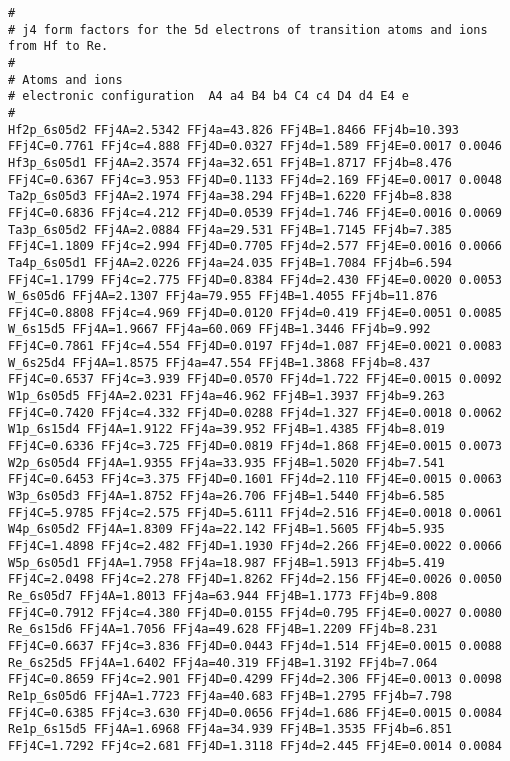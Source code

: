 {\begin{verbatim}
#
# j4 form factors for the 5d electrons of transition atoms and ions from Hf to Re.
#
# Atoms and ions
# electronic configuration  A4 a4 B4 b4 C4 c4 D4 d4 E4 e
#
Hf2p_6s05d2 FFj4A=2.5342 FFj4a=43.826 FFj4B=1.8466 FFj4b=10.393 FFj4C=0.7761 FFj4c=4.888 FFj4D=0.0327 FFj4d=1.589 FFj4E=0.0017 0.0046 
Hf3p_6s05d1 FFj4A=2.3574 FFj4a=32.651 FFj4B=1.8717 FFj4b=8.476 FFj4C=0.6367 FFj4c=3.953 FFj4D=0.1133 FFj4d=2.169 FFj4E=0.0017 0.0048 
Ta2p_6s05d3 FFj4A=2.1974 FFj4a=38.294 FFj4B=1.6220 FFj4b=8.838 FFj4C=0.6836 FFj4c=4.212 FFj4D=0.0539 FFj4d=1.746 FFj4E=0.0016 0.0069 
Ta3p_6s05d2 FFj4A=2.0884 FFj4a=29.531 FFj4B=1.7145 FFj4b=7.385 FFj4C=1.1809 FFj4c=2.994 FFj4D=0.7705 FFj4d=2.577 FFj4E=0.0016 0.0066 
Ta4p_6s05d1 FFj4A=2.0226 FFj4a=24.035 FFj4B=1.7084 FFj4b=6.594 FFj4C=1.1799 FFj4c=2.775 FFj4D=0.8384 FFj4d=2.430 FFj4E=0.0020 0.0053 
W_6s05d6 FFj4A=2.1307 FFj4a=79.955 FFj4B=1.4055 FFj4b=11.876 FFj4C=0.8808 FFj4c=4.969 FFj4D=0.0120 FFj4d=0.419 FFj4E=0.0051 0.0085 
W_6s15d5 FFj4A=1.9667 FFj4a=60.069 FFj4B=1.3446 FFj4b=9.992 FFj4C=0.7861 FFj4c=4.554 FFj4D=0.0197 FFj4d=1.087 FFj4E=0.0021 0.0083 
W_6s25d4 FFj4A=1.8575 FFj4a=47.554 FFj4B=1.3868 FFj4b=8.437 FFj4C=0.6537 FFj4c=3.939 FFj4D=0.0570 FFj4d=1.722 FFj4E=0.0015 0.0092 
W1p_6s05d5 FFj4A=2.0231 FFj4a=46.962 FFj4B=1.3937 FFj4b=9.263 FFj4C=0.7420 FFj4c=4.332 FFj4D=0.0288 FFj4d=1.327 FFj4E=0.0018 0.0062 
W1p_6s15d4 FFj4A=1.9122 FFj4a=39.952 FFj4B=1.4385 FFj4b=8.019 FFj4C=0.6336 FFj4c=3.725 FFj4D=0.0819 FFj4d=1.868 FFj4E=0.0015 0.0073 
W2p_6s05d4 FFj4A=1.9355 FFj4a=33.935 FFj4B=1.5020 FFj4b=7.541 FFj4C=0.6453 FFj4c=3.375 FFj4D=0.1601 FFj4d=2.110 FFj4E=0.0015 0.0063 
W3p_6s05d3 FFj4A=1.8752 FFj4a=26.706 FFj4B=1.5440 FFj4b=6.585 FFj4C=5.9785 FFj4c=2.575 FFj4D=5.6111 FFj4d=2.516 FFj4E=0.0018 0.0061 
W4p_6s05d2 FFj4A=1.8309 FFj4a=22.142 FFj4B=1.5605 FFj4b=5.935 FFj4C=1.4898 FFj4c=2.482 FFj4D=1.1930 FFj4d=2.266 FFj4E=0.0022 0.0066 
W5p_6s05d1 FFj4A=1.7958 FFj4a=18.987 FFj4B=1.5913 FFj4b=5.419 FFj4C=2.0498 FFj4c=2.278 FFj4D=1.8262 FFj4d=2.156 FFj4E=0.0026 0.0050 
Re_6s05d7 FFj4A=1.8013 FFj4a=63.944 FFj4B=1.1773 FFj4b=9.808 FFj4C=0.7912 FFj4c=4.380 FFj4D=0.0155 FFj4d=0.795 FFj4E=0.0027 0.0080 
Re_6s15d6 FFj4A=1.7056 FFj4a=49.628 FFj4B=1.2209 FFj4b=8.231 FFj4C=0.6637 FFj4c=3.836 FFj4D=0.0443 FFj4d=1.514 FFj4E=0.0015 0.0088 
Re_6s25d5 FFj4A=1.6402 FFj4a=40.319 FFj4B=1.3192 FFj4b=7.064 FFj4C=0.8659 FFj4c=2.901 FFj4D=0.4299 FFj4d=2.306 FFj4E=0.0013 0.0098 
Re1p_6s05d6 FFj4A=1.7723 FFj4a=40.683 FFj4B=1.2795 FFj4b=7.798 FFj4C=0.6385 FFj4c=3.630 FFj4D=0.0656 FFj4d=1.686 FFj4E=0.0015 0.0084 
Re1p_6s15d5 FFj4A=1.6968 FFj4a=34.939 FFj4B=1.3535 FFj4b=6.851 FFj4C=1.7292 FFj4c=2.681 FFj4D=1.3118 FFj4d=2.445 FFj4E=0.0014 0.0084 

\end{verbatim}}
